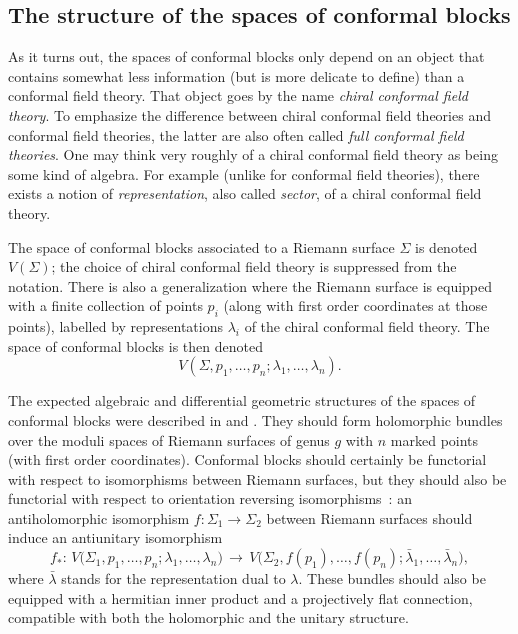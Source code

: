 \documentclass[a4paper,10pt,leqno]{amsart}
\theoremstyle{plain}
\theoremstyle{definition}
\theoremstyle{remark}
\DeclareRobustCommand{\SkipTocEntry}[5]{}
\begin{document}
\subsection*{The structure of the spaces of conformal blocks}
As it turns out, the spaces of conformal blocks only depend on an object that contains somewhat less information (but is more delicate to define) than a conformal field theory.
That object goes by the name \emph{chiral conformal field theory}.
To emphasize the difference between chiral conformal field theories and conformal field theories, the latter are also often called \emph{full conformal field theories}.
One may think very roughly of a chiral conformal field theory as being some kind of algebra.
For example (unlike for conformal field theories), there exists a notion of \emph{representation}, also called \emph{sector}, of a chiral conformal field theory.

The space of conformal blocks associated to a Riemann surface $\Sigma$ is denoted $V(\Sigma)$;
the choice of chiral conformal field theory is suppressed from the notation.
There is also a generalization where the Riemann surface is equipped with a finite collection of points $p_i$ (along with first order coordinates at those points), labelled by representations $\lambda_i$ of the chiral conformal field theory.
The space of conformal blocks is then denoted
\begin{equation}\label{eq: VOA conf blocks}
V(\Sigma,p_1,\ldots,p_n;\lambda_1,\ldots,\lambda_n).
\end{equation}

The expected algebraic and differential geometric structures of the spaces of conformal blocks were described in \cite{Friedan-Shenker(The-analytic-geometry-of-two-dimensional-conformal-field-theory)} and \cite{Moore-Seiberg(classical+quantum-conf-field-theory)}.
They should form holomorphic bundles over the moduli spaces of Riemann surfaces of genus $g$ with $n$ marked points (with first order coordinates).
Conformal blocks should certainly be functorial with respect to isomorphisms between Riemann surfaces, but they should also be functorial with respect to orientation reversing isomorphisms~\cite{Moore-Seiberg(Naturality-in-conformal-field-theory)}:
an antiholomorphic isomorphism ${f:\Sigma_1\to\Sigma_2}$ between Riemann surfaces should induce an antiunitary isomorphism
\[
f_*:\,V\big(\Sigma_1,p_1,\ldots,p_n;\lambda_1,\ldots,\lambda_n\big)\,\to\, V\big(\Sigma_2,f(p_1),\ldots,f(p_n);\bar\lambda_1,\ldots,\bar\lambda_n\big),
\]
where $\bar\lambda$ stands for the representation dual to $\lambda$.
These bundles should also be equipped with a hermitian inner product and a projectively flat connection, compatible with both the holomorphic and the unitary structure.
\end{document}
